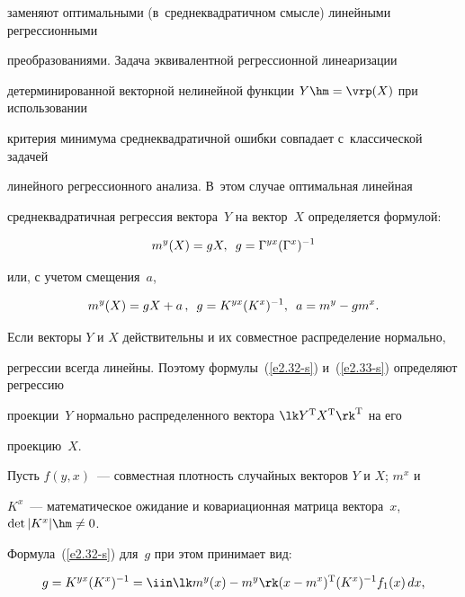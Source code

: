 заменяют оптимальными (в~среднеквадратичном смысле) линейными регрессионными 

преобразованиями. Задача эквивалентной регрессионной линеаризации 

детерминированной векторной  нелинейной функции $Y\hm=\vrp (X)$ при использовании 

критерия минимума среднеквадратичной ошибки совпадает с~классической задачей 

линейного регрессионного анализа. В~этом случае оптимальная линейная 

среднеквадратичная регрессия вектора~$Y$ на вектор~$X$ определяется формулой:

  \begin{equation}

  m^y (X) = g X,\enskip g=\Gamma^{yx} (\Gamma^x)^{-1}\label{e2.32-s}

  \end{equation}

или, с учетом смещения~$a$,

\begin{equation}

m^y(X) =gX+a\,,\enskip g=K^{yx} (K^x)^{-1}, \enskip a=m^y-gm^x.

\label{e2.33-s}

\end{equation}



Если векторы $Y$ и $X$ действительны и их совместное распределение нормально, 

регрессии всегда линейны. Поэтому формулы~(\ref{e2.32-s}) и~(\ref{e2.33-s}) определяют регрессию 

проекции~$Y$ нормально распределенного вектора $\lk Y^{\mathrm{T}} X^{\mathrm{T}}\rk^{\mathrm{T}}$ на его 

проекцию~$X$.



Пусть $f(y,x)$~--- совместная плотность случайных векторов $Y$ и $X$; $m^x$ и 

$K^x$~--- математическое ожидание и ковариационная матрица вектора~$x$, $\mathrm{det}\,|K^x |\hm\ne 0$. 

Формула~(\ref{e2.32-s}) для~$g$ при этом принимает вид:

  \begin{equation}

  g=K^{yx} (K^x)^{-1} =\iin \lk m^y(x) - m^y\rk (x-m^x)^{\mathrm{T}} (K^x)^{-1} f_1 (x) 

\,dx,\label{e2.34-s}

\end{equation}

